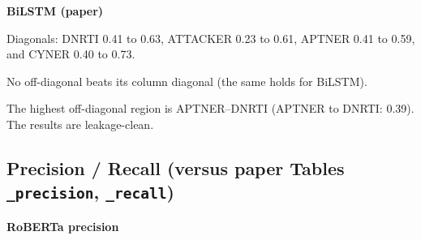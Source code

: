 \textbf{BiLSTM (paper)}


\begin{table}[h!]
\centering
{}%
\caption{BiLSTM span-F1 on each development dataset after training on each dataset.}
\label{tab:cross_eval_matrix_bilstm}
\end{table}

Diagonals: DNRTI 0.41 to 0.63, ATTACKER 0.23 to 0.61, APTNER 0.41 to 0.59, and CYNER 0.40 to 0.73.

No off-diagonal beats its column diagonal (the same holds for BiLSTM).

The highest off-diagonal region is APTNER--DNRTI (APTNER to DNRTI: 0.39). The results are leakage-clean.

\subsection*{Precision / Recall (versus paper Tables \texttt{\_precision}, \texttt{\_recall})}

\textbf{RoBERTa precision}


\begin{table}[h!]
\centering
{}%
\caption{RoBERTa precision on each development dataset after training on each dataset.}
\label{tab:cross_eval_matrix_precision_roberta}
\end{table}

